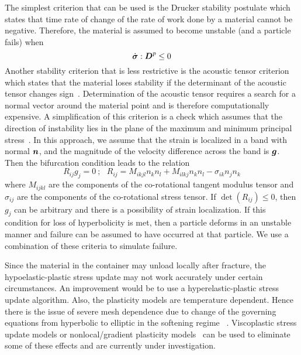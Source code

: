   The simplest criterion that can be used is the Drucker stability postulate
  \cite{Drucker59} which states that time rate of change of the rate of
  work done by a material cannot be negative.  Therefore, the material is
  assumed to become unstable (and a particle fails) when
  \begin{equation}
    \dot\Bsig:\BD^p \le 0
  \end{equation}
  Another stability criterion that is less restrictive is the acoustic
  tensor criterion which states that the material loses stability if the
  determinant of the acoustic tensor changes sign~\cite{Rudnicki75,Perzyna98}.
  Determination of the acoustic tensor requires a search for a normal vector
  around the material point and is therefore computationally expensive.  A
  simplification of this criterion is a check which assumes that the direction
  of instability lies in the plane of the maximum and minimum principal
  stress~\cite{Becker02}.  In this approach, we assume that the strain is
  localized in a band with normal $\Bn$, and the magnitude of the velocity
  difference across the band is $\Bg$.  Then the bifurcation condition
  leads to the relation
  \begin{equation} 
    R_{ij} g_{j} = 0 ~;~~~
    R_{ij} = M_{ikjl} n_k n_l + M_{ilkj} n_k n_l - \sigma_{ik} n_j n_k
  \end{equation}
  where $M_{ijkl}$ are the components of the co-rotational tangent
  modulus tensor and $\sigma_{ij}$ are the components of the co-rotational
  stress tensor.  If $\det(R_{ij}) \le 0 $, then $g_j$ can be arbitrary and
  there is a possibility of strain localization.  If this condition for
  loss of hyperbolicity is met,  then a particle deforms in an unstable
  manner and failure can be assumed to have occurred at that particle.
  We use a combination of these criteria to simulate failure.

  Since the material in the container may unload locally after fracture, the
  hypoelastic-plastic stress update may not work accurately under certain
  circumstances.  An improvement would be to use a hyperelastic-plastic stress
  update algorithm.  Also, the plasticity models are temperature dependent.
  Hence there is the issue of severe mesh dependence due to change of the
  governing equations from hyperbolic to elliptic in the softening regime
  ~\cite{Hill75,Bazant85,Tver90}.  Viscoplastic stress update models or
  nonlocal/gradient plasticity models~\cite{Ramaswamy98,Hao00} can be used
  to eliminate some of these effects and are currently under investigation.

